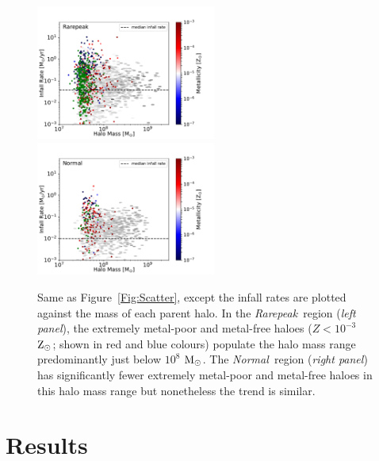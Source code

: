 \documentclass[graphics, twocolumn, usenatbib]{mn2e}
\newcommand{\msolarc} {$\rm{M_{\odot}}$}
\newcommand{\zsolarc} {$\rm{Z_{\odot}}$}
\newcommand{\rarepeak} {\textit{Rarepeak~}}
\newcommand{\normal} {\textit{Normal~}}
\newcommand{\void} {\textit{Void~}}
\begin{document}
\begin{figure}
\centering
\begin{minipage}{175mm}      \begin{center} 
\centerline{
\includegraphics[width=0.525\textwidth]{FIGURES/Rarepeak_MdotMHaloZ_Hexbin.pdf}
\includegraphics[width=0.525\textwidth]{FIGURES/Normal_MdotMHaloZ_Hexbin.pdf}}
\caption{Same as Figure~\ref{Fig:Scatter}, except
the infall rates are plotted against the mass of each parent halo.
In the \rarepeak region (\textit{left panel}), the extremely metal-poor
  and metal-free haloes ($Z < 10^{-3}$ \zsolarc; shown in red and blue colours) populate the halo mass range predominantly just below $10^{8}$
  \msolarc.  The \normal region (\textit{right panel})
 has significantly fewer extremely metal-poor and metal-free haloes in this halo mass range but nonetheless the trend is similar.}
\label{Fig:HaloMass}
\end{center} \end{minipage}

\end{figure}


\section{Results} \label{Sec:Results}
\end{document}
